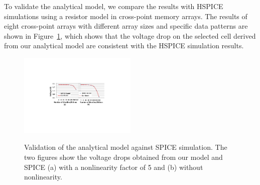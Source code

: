 To validate the analytical model, we compare the results with
HSPICE~\cite{HSPICE} simulations using a resistor model in cross-point
memory arrays. The results of eight cross-point arrays with different
array sizes and specific data patterns are shown in
Figure~\ref{fig:validation}, which shows that the voltage drop on the
selected cell derived from our analytical model are consistent with the
HSPICE simulation results.
\begin{figure}%
\centering\label{fig:SPICE}
  \includegraphics[width=0.5\textwidth]{./figures/SPICE1.pdf}\\
  \caption{Validation of the analytical model against SPICE simulation. The two figures show the voltage drops obtained from our model and SPICE (a) with a nonlinearity factor of 5 and (b) without nonlinearity.}\label{fig:validation}
    \vspace{-10pt}
\end{figure}
%
